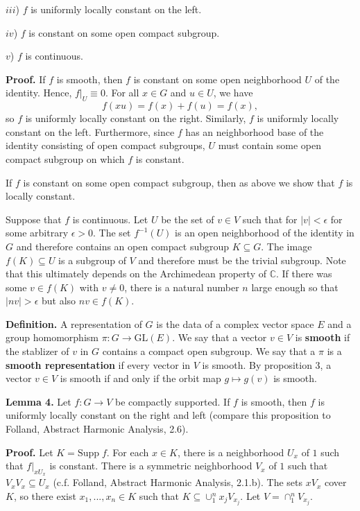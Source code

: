 \documentclass[12pt]{article}
\begin{document}
$iii$) $f$ is uniformly locally constant on the left.

$iv$) $f$ is constant on some open compact subgroup.

$v$) $f$ is continuous.

\textbf{Proof.} If $f$ is smooth, then $f$ is constant on some open neighborhood
$U$ of the identity. Hence, $f|_{U} \equiv 0$. For all $x \in G$ and $u \in U$,
we have
%
\[f\left(xu\right) = f\left(x\right) + f\left(u\right) = f\left(x\right),\]
%
so $f$ is uniformly locally constant on the right. Similarly, $f$ is uniformly
locally constant on the left. Furthermore, since $f$ has an neighborhood base of
the identity consisting of open compact subgroups, $U$ must contain some open
compact subgroup on which $f$ is constant. 

If $f$ is constant on some open compact subgroup, then as above we show that $f$
is locally constant.

Suppose that $f$ is continuous. Let $U$ be the set of $v \in V$ such that for
$\left|v\right| < \epsilon$ for some arbitrary $\epsilon > 0$. The set
$f^{-1}\left(U\right)$ is an open neighborhood of the identity in $G$ and
therefore contains an open compact subgroup $K \subseteq G$. The image
$f\left(K\right) \subseteq U$ is a subgroup of $V$ and therefore must be the
trivial subgroup. Note that this ultimately depends on the Archimedean property
of $\mathbb{C}$. If there was some $v \in f\left(K\right)$ with $v \neq 0$,
there is a natural number $n$ large enough so that $\left|nv\right| > \epsilon$
but also $nv \in f\left(K\right)$.

\textbf{Definition.} A representation of $G$ is the data of a complex vector
space $E$ and a group homomorphism $\pi : G \rightarrow
\text{GL}\left(E\right)$. We say that a vector $v \in V$ is \textbf{smooth} if
the stablizer of $v$ in $G$ contains a compact open subgroup. We say that a
$\pi$ is a \textbf{smooth representation} if every vector in $V$ is smooth. By
proposition 3, a vector $v \in V$ is smooth if and only if the orbit map $g
\mapsto g\left(v\right)$ is smooth.

\textbf{Lemma 4.} Let $f : G \rightarrow V$ be compactly supported. If $f$ is
smooth, then $f$ is uniformly locally constant on the right and left (compare
this proposition to Folland, Abstract Harmonic Analysis, 2.6).

\textbf{Proof.} Let $K = \text{Supp} \; f$. For each $x \in K$, there is a
neighborhood $U_{x}$ of $1$ such that $f|_{xU_{x}}$ is constant. There is a
symmetric neighborhood $V_{x}$ of $1$ such that $V_{x} V_{x} \subseteq U_{x}$
(c.f. Folland, Abstract Harmonic Analysis, 2.1.b). The sets $x V_{x}$ cover $K$,
so there exist $x_1, ..., x_{n} \in K$ such that $K \subseteq \cup_{1}^{n}
x_{j}V_{x_{j}}$. Let $V = \cap_{1}^{n} V_{x_{j}}$.
\end{document}
